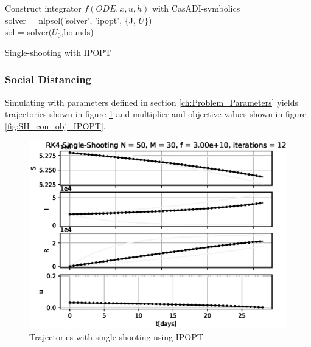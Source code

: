 \begin{algorithm}[H]
\SetAlgoLined
{}
Construct integrator $f(ODE, x, u, h)$ with CasADI-symbolics\\
 solver = nlpsol('solver', 'ipopt', $\{$J, $U\}$)\\
 sol = solver($U_0$,bounds)
 \caption{Single-shooting with IPOPT}
 \label{alg:SingleShooting_Integration_IPOPT}
\end{algorithm}
\subsubsection{Social Distancing}
Simulating with parameters defined in section \ref{ch:Problem_Parameters} yields trajectories shown in figure \ref{fig:SH_Traj_IPOPT} and multiplier and objective values shown in figure \ref{fig:SH_con_obj_IPOPT}.

\begin{figure}[H]
    \centering
    \includegraphics[width=.8\textwidth]{pythonProject/Figures/Single_Shooting_Trajectory_IPOPT.eps}
    \caption{Trajectories with single shooting using IPOPT}
    \label{fig:SH_Traj_IPOPT}
\end{figure}

